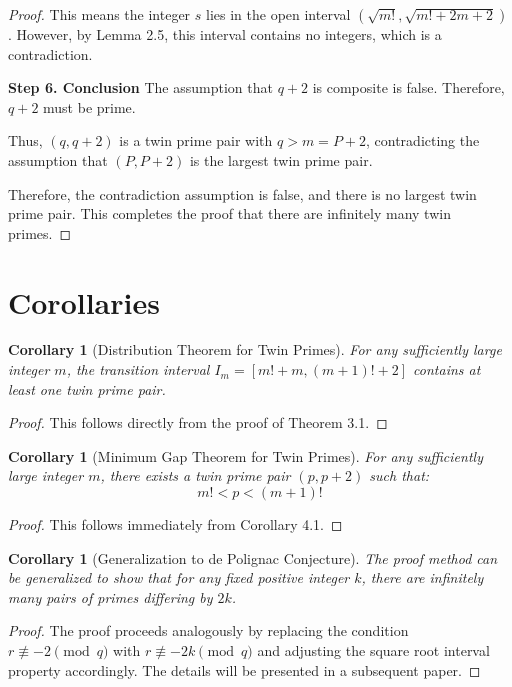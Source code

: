 \documentclass[12pt,letterpaper,reqno]{amsart}
\theoremstyle{plain}
\newtheorem{corollary}[theorem]{Corollary}
\theoremstyle{definition}
\theoremstyle{remark}
\begin{document}
\begin{proof}
		This means the integer $s$ lies in the open interval $(\sqrt{m!}, \sqrt{m!+2m+2})$. However, by Lemma 2.5, this interval contains no integers, which is a contradiction.
		
		\medskip
		\noindent\textbf{Step 6. Conclusion}
		The assumption that $q+2$ is composite is false. Therefore, $q+2$ must be prime.
		
		Thus, $(q, q+2)$ is a twin prime pair with $q > m = P+2$, contradicting the assumption that $(P, P+2)$ is the largest twin prime pair.
		
		Therefore, the contradiction assumption is false, and there is no largest twin prime pair. This completes the proof that there are infinitely many twin primes.
	\end{proof}
	
	\section{Corollaries}
	
	\begin{corollary}[Distribution Theorem for Twin Primes]
		For any sufficiently large integer $m$, the transition interval $I_m = [m!+m, (m+1)!+2]$ contains at least one twin prime pair.
	\end{corollary}
	
	\begin{proof}
		This follows directly from the proof of Theorem 3.1.
	\end{proof}
	
	\begin{corollary}[Minimum Gap Theorem for Twin Primes]
		For any sufficiently large integer $m$, there exists a twin prime pair $(p, p+2)$ such that:
		\[
		m! < p < (m+1)!
		\]
	\end{corollary}
	
	\begin{proof}
		This follows immediately from Corollary 4.1.
	\end{proof}
	
	\begin{corollary}[Generalization to de Polignac Conjecture]
		The proof method can be generalized to show that for any fixed positive integer $k$, there are infinitely many pairs of primes differing by $2k$.
	\end{corollary}
	
	\begin{proof}
		The proof proceeds analogously by replacing the condition $r \not\equiv -2 \pmod{q}$ with $r \not\equiv -2k \pmod{q}$ and adjusting the square root interval property accordingly. The details will be presented in a subsequent paper.
	\end{proof}
	
\end{document}
